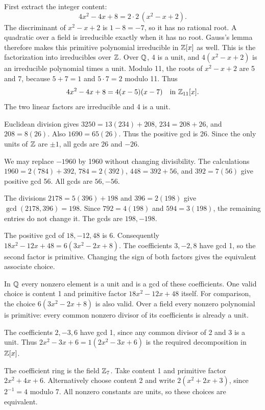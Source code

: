 First extract the integer content:
\[4x^2-4x+8=2\cdot2\,(x^2-x+2).\]
The discriminant of $x^2-x+2$ is $1-8=-7$, so it has no rational root. A quadratic over a field is irreducible exactly when it has no root. Gauss's lemma therefore makes this primitive polynomial irreducible in $\mathbb{Z}[x]$ as well. This is the factorization into irreducibles over $\mathbb{Z}$.
Over $\mathbb{Q}$, 4 is a unit, and $4(x^2-x+2)$ is an irreducible polynomial times a unit. Modulo 11, the roots of $x^2-x+2$ are 5 and 7, because $5+7=1$ and $5\cdot7=2$ modulo 11. Thus
\[4x^2-4x+8=4(x-5)(x-7)\quad\text{in }\mathbb{Z}_{11}[x].\]
The two linear factors are irreducible and 4 is a unit.

Euclidean division gives $3250=13(234)+208$, $234=208+26$, and $208=8(26)$. Also $1690=65(26)$. Thus the positive gcd is 26. Since the only units of $\mathbb{Z}$ are $\pm1$, all gcds are $26$ and $-26$.

We may replace $-1960$ by 1960 without changing divisibility. The calculations $1960=2(784)+392$, $784=2(392)$, $448=392+56$, and $392=7(56)$ give positive gcd 56. All gcds are $56,-56$.

The divisions $2178=5(396)+198$ and $396=2(198)$ give $\gcd(2178,396)=198$. Since $792=4(198)$ and $594=3(198)$, the remaining entries do not change it. The gcds are $198,-198$.

The positive gcd of $18,-12,48$ is 6. Consequently $18x^2-12x+48=6(3x^2-2x+8)$. The coefficients $3,-2,8$ have gcd 1, so the second factor is primitive. Changing the sign of both factors gives the equivalent associate choice.

In $\mathbb{Q}$ every nonzero element is a unit and is a gcd of these coefficients. One valid choice is content 1 and primitive factor $18x^2-12x+48$ itself. For comparison, the choice $6(3x^2-2x+8)$ is also valid. Over a field every nonzero polynomial is primitive: every common nonzero divisor of its coefficients is already a unit.

The coefficients $2,-3,6$ have gcd 1, since any common divisor of 2 and 3 is a unit. Thus $2x^2-3x+6=1(2x^2-3x+6)$ is the required decomposition in $\mathbb{Z}[x]$.

The coefficient ring is the field $\mathbb{Z}_7$. Take content 1 and primitive factor $2x^2+4x+6$. Alternatively choose content 2 and write $2(x^2+2x+3)$, since $2^{-1}=4$ modulo 7. All nonzero constants are units, so these choices are equivalent.

